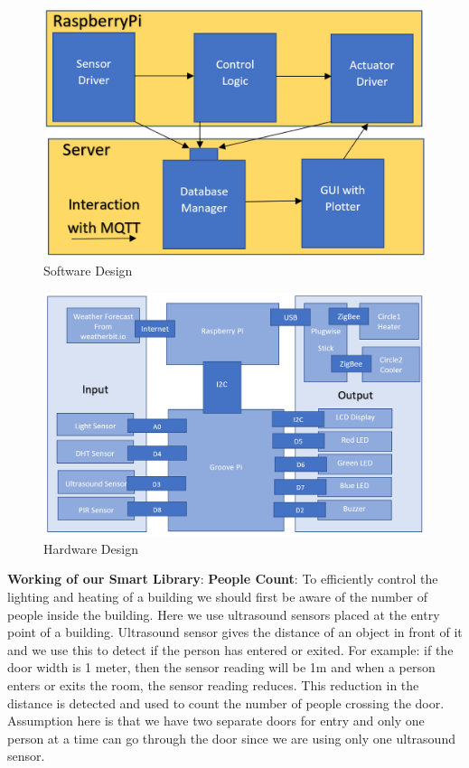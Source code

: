 \documentclass[runningheads]{llncs}
\begin{document}
\begin{figure}
\begin{center}
\includegraphics[scale=0.5]{fig3}
\caption{Software Design}
\end{center}
\end{figure}
\begin{figure}
\begin{center}
\includegraphics[scale=0.5]{fig4}
\caption{Hardware Design}
\end{center}
\end{figure}
\vspace{3mm}
\textbf{Working of our Smart Library}:
\vspace{5mm}
\newline\textbf{People Count}:
To efficiently control the lighting and heating of a building we should first be aware of the number of people inside the building. Here we use ultrasound sensors placed at the entry point of a building. Ultrasound sensor gives the distance of an object in front of it and we use this to detect if the person has entered or exited. For example: if the door width is 1 meter, then the sensor reading will be 1m and when a person enters or exits the room, the sensor reading reduces. This reduction in the distance is detected and used to count the number of people crossing the door. Assumption here is that we have two separate doors for entry and only one person at a time can go through the door since we are using only one ultrasound sensor.
\end{document}
